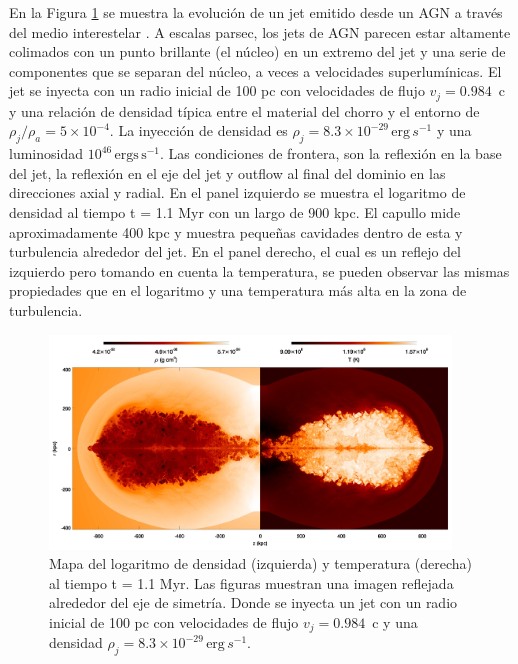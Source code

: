 \documentclass[12pt,a4paper]{book}
\begin{document}
{\color{blue} En la Figura \ref{fig:jet_agn} se muestra la evolución de un jet emitido desde un AGN a través del medio interestelar \cite{2011ApJ...743...42P}. A escalas parsec, los jets de AGN parecen estar altamente colimados con un punto brillante 
(el núcleo) en un extremo del jet y una serie de componentes que se separan del núcleo, a veces a velocidades superlumínicas. El jet se inyecta con un radio inicial de 100 pc con velocidades de flujo 
$v_j = 0.984$~c  y una relación de densidad típica entre el material del chorro y el entorno de $\rho_j / \rho_a = 5\times10^{-4}$. La inyección de densidad es $\rho_j = 8.3 \times 10^{-29} \, \text{erg}\,s^{-1}$ y una 
luminosidad $10^{46} \, \text{ergs} \, \text{s}^{-1}$. Las condiciones de frontera, son la reflexión en la base del jet, la reflexión en el eje del jet y outflow al final del dominio en las direcciones axial y radial.
En el panel izquierdo se muestra el logaritmo de densidad al tiempo t = 1.1 Myr con un largo de 900 kpc. El capullo mide aproximadamente 400 kpc y muestra pequeñas cavidades dentro de esta y turbulencia alrededor del jet.
En el panel derecho, el cual es un reflejo del izquierdo pero tomando en cuenta la temperatura, se pueden observar las mismas propiedades que en el logaritmo y una temperatura más alta en la zona de turbulencia.}



\begin{figure}
  \begin{center}
    \includegraphics[width=0.95\textwidth]{Figuras/Introduccion/jet_agn.png}
  \end{center}
  \caption{Mapa del logaritmo de densidad (izquierda) y temperatura (derecha) al tiempo t = 1.1 Myr. Las figuras muestran una imagen reflejada alrededor del eje de simetría. Donde se inyecta un jet con un radio inicial de 100 pc 
  con velocidades de flujo $v_j = 0.984$~c y una densidad $\rho_j = 8.3 \times 10^{-29} \, \text{erg}\,s^{-1}$.}
  \label{fig:jet_agn}
\end{figure}
\end{document}
